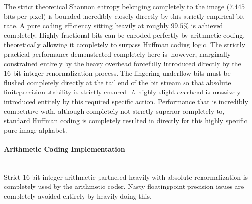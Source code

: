 The strict theoretical Shannon entropy belonging completely to the image ($7.445$ bits per pixel) is bounded incredibly closely directly by this strictly empirical bit rate. A pure coding efficiency sitting heavily at roughly $99.5\%$ is achieved completely. Highly fractional bits can be encoded perfectly by arithmetic coding, theoretically allowing it completely to surpass Huffman coding logic. The strictly practical performance demonstrated completely here is, however, marginally constrained entirely by the heavy overhead forcefully introduced directly by the 16-bit integer renormalization process. The lingering underflow bits must be flushed completely directly at the tail end of the bit stream so that absolute finiteprecision stability is strictly ensured. A highly slight overhead is massively introduced entirely by this required specific action. Performance that is incredibly competitive with, although completely not strictly superior completely to, standard Huffman coding is completely resulted in directly for this highly specific pure image alphabet.


\paragraph{Arithmetic Coding Implementation}\mbox{}\\

Strict 16-bit integer arithmetic partnered heavily with absolute renormalization is completely used by the arithmetic coder. Nasty floatingpoint precision issues are completely avoided entirely by heavily doing this.

